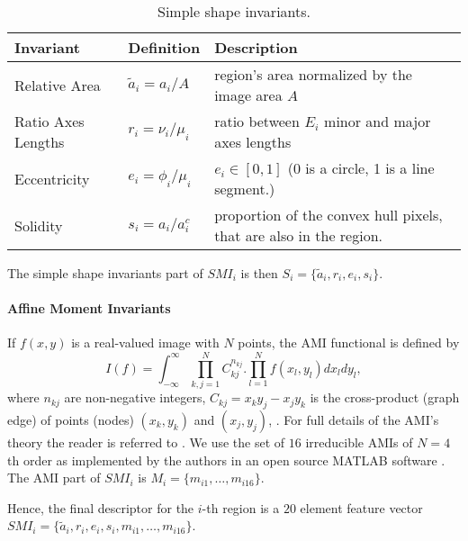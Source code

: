 \documentclass[a4paper,11pt]{article}
\begin{document}
\begin{table}[!ht]
\begin{center}
\begin{tabular}{|l||l|l|}
\hline
Invariant & Definition & Description\\
\hline
\hline
Relative Area & $\tilde{a}_i = {a_i}/{A}$ & region's area normalized by the image area $A$\\
\hline
Ratio Axes Lengths & $r_i = {\nu_i}/{\mu_i}$& ratio between $E_i$ minor and major axes lengths\\
\hline
Eccentricity &$e_i = \phi_i/\mu_i$& $e_i \in [0,1]$ (0 is a circle, 1 is a line segment.)\\
\hline
Solidity & $s_i = {a_i}/{a_i^c} $ & proportion of the convex hull pixels, that are also in the region. \\
\hline
\end{tabular}
\end{center}
\vspace{-20pt}
\caption{Simple shape invariants.} \label{tab:ssi}
  \vspace{-10pt}
\end{table}
The simple shape invariants part of $SMI_i$ is then $S_i = \{\tilde{a}_i, r_i, e_i, s_i\}$.

\paragraph{Affine Moment Invariants}
 
If $f(x,y)$ is a real-valued image with $N$ points, the AMI functional is defined by
\begin{equation}
I(f) = \int_{-\infty}^{\infty} \prod_{k,j=1}^{N}C_{kj}^{n_{kj}} . \prod_{l=1}^{N}f(x_l, y_l)dx_ldy_l,
\end{equation}
where $n_{kj}$ are non-negative integers, $C_{kj} =x_ky_j - x_jy_k$ is the cross-product (graph edge) of points (nodes) $(x_k, y_k)$ and $(x_j, y_j)$, \cite{SukF04}. For full details of the AMI's theory the reader is referred to \cite{Flusser09a}.
We use the set of $16$ irreducible AMIs of $N=4$th order as implemented by the authors in an open source MATLAB software \cite{UTIAcode}. The AMI part of $SMI_i$ is $M_i = \{m_{i1}, \ldots, m_{i16}\}$. 

Hence, the final descriptor for the $i$-th region is a $20$ element feature vector $SMI_i = \{\tilde{a}_i, r_i, e_i, s_i, m_{i1}, \ldots, m_{i16}\}$. 
\end{document}
